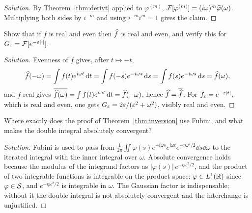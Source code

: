 \begin{proof}[Solution]
By Theorem~\ref{thm:derivt} applied to $\varphi^{(m)}$,
$\mathcal{F}[\varphi^{(m)}]=(i\omega)^{m}\widehat{\varphi}(\omega)$. Multiplying both sides by $i^{-m}$ and using
$i^{-m}i^{m}=1$ gives the claim.
\end{proof}

\begin{exercise}\label{ex15}
Show that if $f$ is real and even then $\widehat{f}$ is real and even, and verify this for
$G_{\varepsilon}=\mathcal{F}[e^{-\varepsilon|\cdot|}]$.
\end{exercise}

\begin{proof}[Solution]
Evenness of $f$ gives, after $t\mapsto-t$,
\begin{equation}
\widehat{f}(-\omega)=\int f(t)e^{i\omega t}\,\mathrm{d} t=\int f(-s)e^{-i\omega s}\,\mathrm{d} s=\int f(s)e^{-i\omega s}\,\mathrm{d} s=\widehat{f}(\omega),
\end{equation}
and $f$ real gives $\overline{\widehat{f}(\omega)}=\int f(t)e^{i\omega t}\,\mathrm{d} t=\widehat{f}(-\omega)$, hence
$\widehat{f}=\overline{\widehat{f}}$. For $f_{\varepsilon}=e^{-\varepsilon|t|}$, which is real and even, one gets
$G_{\varepsilon}=2\varepsilon/(\varepsilon^{2}+\omega^{2})$, visibly real and even.
\end{proof}

\begin{exercise}\label{ex16}
Where exactly does the proof of Theorem~\ref{thm:inversion} use Fubini, and what makes the double
integral absolutely convergent?
\end{exercise}

\begin{proof}[Solution]
Fubini is used to pass from
$\frac{1}{2\pi}\iint\varphi(s)e^{-i\omega s}e^{i\omega t}e^{-\eta\omega^{2}/2}\dd s\dd\omega$ to the
iterated integral with the inner integral over $\omega$. Absolute convergence holds because the modulus
of the integrand factors as $|\varphi(s)|\,e^{-\eta\omega^{2}/2}$, and the product of two integrable
functions is integrable on the product space: $\varphi\in L^{1}(\mathbb{R})$ since $\varphi\in\mathcal{S}$, and
$e^{-\eta\omega^{2}/2}$ is integrable in $\omega$. The Gaussian factor is indispensable; without it the
double integral is not absolutely convergent and the interchange is unjustified.
\end{proof}
